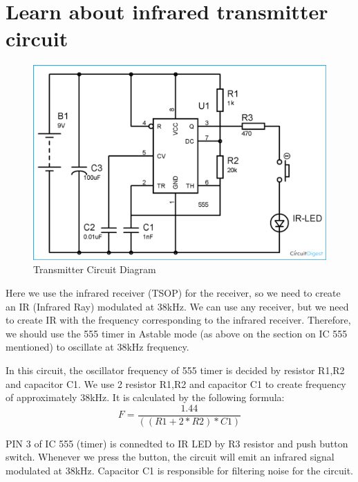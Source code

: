 \documentclass[a4paper]{report}
\begin{document}
    \section{Learn about infrared transmitter circuit}
    \begin{figure}[ht]
        \centering
        \includegraphics[width=\linewidth]{transmitter.png}
        \caption{\label{fig:boat}Transmitter Circuit Diagram}
    \end{figure}
        \newpage
        Here we use the infrared receiver (TSOP) for the receiver, so we need to create an IR (Infrared Ray) 
        modulated at 38kHz. We can use any receiver, but we need to create IR with the frequency corresponding 
        to the infrared receiver. Therefore, we should use the 555 timer in Astable mode (as above on the section on IC 555 mentioned) 
        to oscillate at 38kHz frequency.
        \linebreak
        \par In this circuit, the oscillator frequency of 555 timer is decided by resistor R1,R2 and capacitor C1. 
        We use 2 resistor R1,R2 and capacitor C1 to create frequency of approximately 38kHz. It is calculated 
        by the following formula: 
        \begin{equation*}
            F = \frac{1.44}{((R1+2*R2)*C1)}
        \end{equation*}
        \linebreak
        \par PIN 3 of IC 555 (timer) is connedted to IR LED by R3 resistor and push button switch. 
        Whenever we press the button, the circuit will emit an infrared signal modulated at 38kHz. 
        Capacitor C1 is responsible for filtering noise for the circuit.
        \newpage
\end{document}
